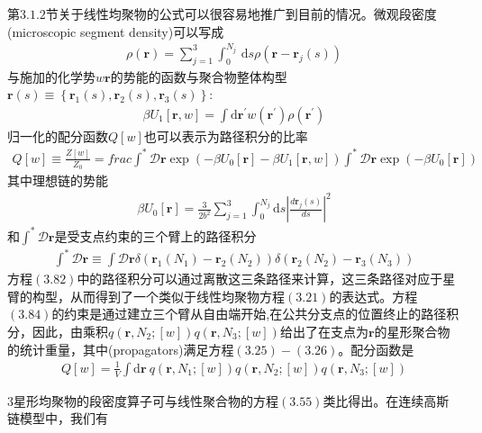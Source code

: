 第$3.1.2$节关于线性均聚物的公式可以很容易地推广到目前的情况。微观段密度(microscopic segment density)可以写成
\begin{gather}
\rho(\mathbf{r})=\sum_{j=1}^3 \int_0^{N_j}\, \mathrm{d}s\rho(\mathbf{r}-\mathbf{r}_j(s))
\end{gather}
与施加的化学势$w \mathbf{r}$的势能的函数与聚合物整体构型$\mathbf{r}(s)\equiv \left\{ \mathbf{r}_1(s),\mathbf{r}_2(s),\mathbf{r}_3(s) \right\}:$
\begin{gather}
\beta U_1[\mathbf{r},w]=\int \mathrm{d}\mathbf{r}^{'}w(\mathbf{r}^{'})\rho(\mathbf{r}^{'})
\end{gather}
归一化的配分函数$Q[w]$也可以表示为路径积分的比率
\begin{gather}
Q[w]\equiv \frac{Z[w]}{Z_0}=frac{\int^{*}\mathcal{D}\mathbf{r}\exp (-\beta U_0[\mathbf{r}]-\beta U_1[\mathbf{r},w])}{\int^{*}\mathcal{D}\mathbf{r}\exp (-\beta U_0[\mathbf{r}])}
\end{gather}
其中理想链的势能
\begin{gather}
\beta U_0[\mathbf{r}]=\frac{3}{2b^2}\sum_{j=1}^3\int_{0}^{N_j} \mathrm{d}s\left| \frac{d\mathbf{r}_j(s)}{ds} \right|^2
\end{gather}
和$\int^{*}\mathcal{D}\mathbf{r}$是受支点约束的三个臂上的路径积分
\begin{gather}
\int^{*}\mathcal{D}\mathbf{r}\equiv \int \mathcal{D}\mathbf{r}\delta (\mathbf{r}_1(N_1)-\mathbf{r}_2(N_2))\delta (\mathbf{r}_2(N_2)-\mathbf{r}_3(N_3))
\end{gather}
方程$(3.82)$中的路径积分可以通过离散这三条路径来计算，这三条路径对应于星臂的构型，从而得到了一个类似于线性均聚物方程$(3.21)$的表达式。方程$(3.84)$的约束是通过建立三个臂从自由端开始,在公共分支点的位置终止的路径积分，因此，由乘积$q(\mathbf{r},N_2;[w])q(\mathbf{r},N_3;[w])$给出了在支点为$\mathbf{r}$的星形聚合物的统计重量，其中(propagators)满足方程$(3.25)-(3.26)$。配分函数是
\begin{gather}
Q[w]=\frac{1}{V}\int \mathrm{d}\mathbf{r}~q(\mathbf{r},N_1;[w])q(\mathbf{r},N_2;[w])q(\mathbf{r},N_3;[w])
\end{gather}

$3$星形均聚物的段密度算子可与线性聚合物的方程$(3.55)$类比得出。在连续高斯链模型中，我们有
















